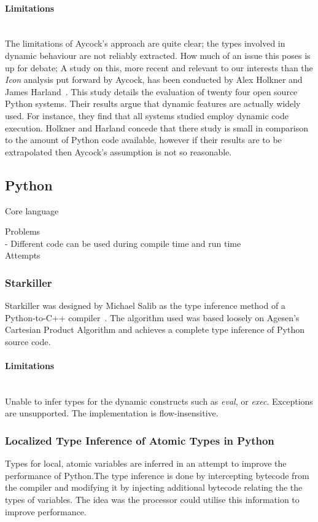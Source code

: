 \documentclass[12pt, titlepage]{article}
\begin{document}
\paragraph{Limitations}\mbox{}\\
The limitations of Aycock's approach are quite clear; the types involved in dynamic behaviour are not reliably extracted. How much of an issue this poses is up for debate;
A study on this, more recent and relevant to our interests than the \textit{Icon} analysis put forward by Aycock, has been conducted by Alex Holkner and James Harland~\cite{evaluatingDynamicBehaviour}. This study details the evaluation of twenty four open source Python systems. Their results argue that dynamic features are actually widely used. For instance, they find that all systems studied employ dynamic code execution. Holkner and Harland concede that there study is small in comparison to the amount of Python code available, however if their results are to be extrapolated then Aycock's assumption is not so reasonable.

\subsection{Python}
Core language

Problems \\
- Different code can be used during compile time and run time  \\

Attempts \\
\subsubsection{Starkiller}
Starkiller was designed by Michael Salib as the type inference method of a Python-to-C++ compiler~\cite{starkiller}. The algorithm used was based loosely on Agesen’s Cartesian Product Algorithm and achieves a complete type inference of Python source code.

\paragraph*{Limitations}\mbox{}\\
Unable to infer types for the dynamic constructs such as \textit{eval}, or \textit{exec}. Exceptions are unsupported. The implementation is flow-insensitive.

\subsubsection{Localized Type Inference of Atomic Types in Python}
Types for local, atomic variables are inferred in an attempt to improve the performance of Python.The type inference is done by intercepting bytecode from the compiler and modifying it by injecting additional bytecode relating the the types of variables. The idea was the processor could utilise this information to improve performance.
\end{document}
